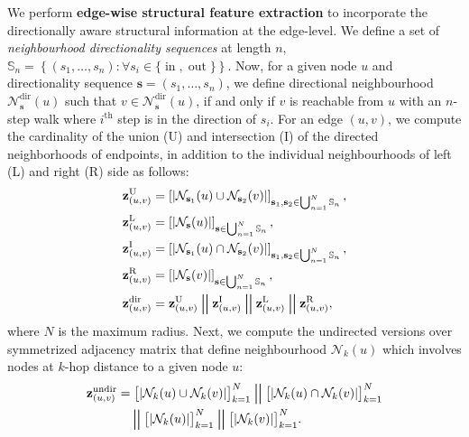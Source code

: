 \documentclass{article}
\DeclareMathOperator*{\concat}{\scalerel*{\Vert}{\sum}}
\begin{document}
We perform \textbf{edge-wise structural feature extraction} to incorporate the directionally aware structural information at the edge-level. We define a set of \emph{neighbourhood directionality sequences} at length $n$, $\mathbb{S}_n = \left\{(s_1, \dots, s_n): \forall s_i \in \{\operatorname{in}, \operatorname{out}\}\right\}$. Now, for a given node $u$ and directionality sequence $\mathbf{s} = (s_1, \dots, s_n)$, we define directional neighbourhood $\mathcal{N}^{\operatorname{dir}}_{\mathbf{s}}(u)$ such that $v \in \mathcal{N}^{\operatorname{dir}}_{\mathbf{s}}(u)$, if and only if $v$ is reachable from $u$ with an $n$-step walk where $i^{\operatorname{th}}$ step is in the direction of $s_i$. For an edge $(u, v)$, we compute the cardinality of the union (U) and intersection (I) of the directed neighborhoods of endpoints, in addition to the individual neighbourhoods of left (L) and right (R) side as follows: 
    \begin{align}
        & \mathbf{z}_{(u, v)}^{\operatorname{U}} = \left[
        |\mathcal{N}_{\mathbf{s}_1}(u) \cup \mathcal{N}_{\mathbf{s}_2}(v)| \right]_{\mathbf{s}_1, \mathbf{s}_2 \in \bigcup_{n=1}^N\mathbb{S}_n}, \\
        & \mathbf{z}_{(u, v)}^{\operatorname{L}} = \left[ |\mathcal{N}_{\mathbf{s}}(u)| \right]_{\mathbf{s} \in \bigcup_{n=1}^N\mathbb{S}_n}, \label{eq:dsf1} \\
        & \mathbf{z}_{(u, v)}^{\operatorname{I}} = \left[ |\mathcal{N}_{\mathbf{s}_1}(u) \cap \mathcal{N}_{\mathbf{s}_2}(v)| \right]_{\mathbf{s}_1, \mathbf{s}_2 \in \bigcup_{n=1}^N\mathbb{S}_n}, \\
        & \mathbf{z}_{(u, v)}^{\operatorname{R}} = \left[ |\mathcal{N}_{\mathbf{s}}(v)| \right]_{\mathbf{s} \in \bigcup_{n=1}^N\mathbb{S}_n}, \label{eq:dsf2} \\
        & \mathbf{z}_{(u, v)}^{\operatorname{dir}} = \mathbf{z}_{(u, v)}^{\operatorname{ U}} \concat \mathbf{z}_{(u, v)}^{\operatorname{I}} \concat \mathbf{z}_{(u, v)}^{\operatorname{L}} \concat \mathbf{z}_{(u, v)}^{\operatorname{R}} \label{eq:dsf3},
    \end{align}
    where $N$ is the maximum radius.
Next, we compute the undirected versions over symmetrized adjacency matrix that define neighbourhood $\mathcal{N}_{k}(u)$ which involves nodes at $k$-hop distance to a given node $u$:
\begin{align}
    \mathbf{z}_{(u, v)}^{\operatorname{undir}} 
    &= \big[|\mathcal{N}_{k}(u) \cup \mathcal{N}_{k}(v)|\big]_{k=1}^{N} \concat \big[|\mathcal{N}_{k}(u) \cap \mathcal{N}_{k}(v)|\big]_{k=1}^{N} \notag \\
    &\quad \concat \big[|\mathcal{N}_{k}(u)|\big]_{k=1}^{N} 
    \concat \big[|\mathcal{N}_{k}(v)|\big]_{k=1}^{N}.
\end{align}
\end{document}
